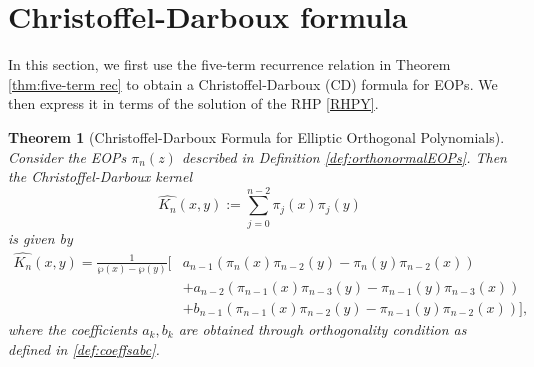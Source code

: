 \documentclass[11pt,a4paper]{article}
\newtheorem{theorem}{Theorem}
\theoremstyle{definition}
\numberwithin{equation}{section}
\numberwithin{theorem}{section}
\begin{document}
\section{Christoffel-Darboux formula}\label{sec:CD}
In this section, we first use the five-term recurrence relation in Theorem \ref{thm:five-term rec} to obtain a Christoffel-Darboux (CD) formula for EOPs. We then express it in terms of the solution of the RHP \ref{RHPY}. 

\begin{theorem}[Christoffel-Darboux Formula for Elliptic Orthogonal Polynomials]\label{thm:CD}
Consider the EOPs $\pi_n(z)$ described in Definition \ref{def:orthonormalEOPs}. Then the Christoffel-Darboux kernel
\[
\widehat{K_n}(x,y) := \sum_{j=0}^{n-2} \pi_j(x)\pi_j(y)
\]
is given by
\begin{equation} \label{eq:cd}
\begin{aligned}
\widehat{K_n}(x,y) = \frac{1}{\wp(x) - \wp(y)} \bigg[&a_{n-1} \left( \pi_n(x)\pi_{n-2}(y) - \pi_n(y)\pi_{n-2}(x) \right) \\
&+ a_{n-2} \left( \pi_{n-1}(x)\pi_{n-3}(y) - \pi_{n-1}(y)\pi_{n-3}(x) \right) \\
&+ b_{n-1} \left( \pi_{n-1}(x)\pi_{n-2}(y) - \pi_{n-1}(y)\pi_{n-2}(x) \right) \bigg],
\end{aligned}
\end{equation}
where the coefficients $a_{k}, b_{k}$ are obtained through orthogonality condition as defined in \eqref{def:coeffsabc}.
\end{theorem}
\end{document}
